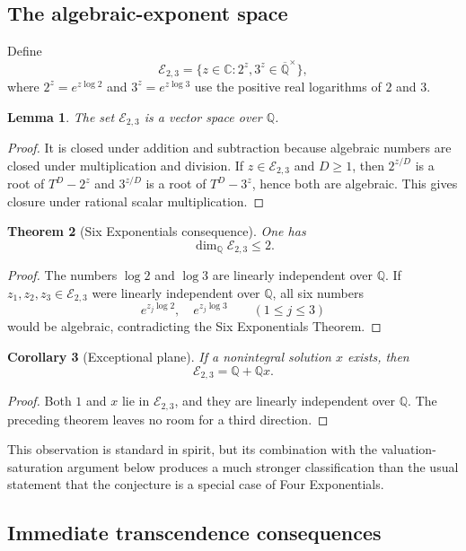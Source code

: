 \documentclass[11pt,oneside]{article}
\newtheorem{theorem}{Theorem}[section]
\newtheorem{lemma}[theorem]{Lemma}
\newtheorem{corollary}[theorem]{Corollary}
\theoremstyle{definition}
\newcommand{\Q}{\mathbb Q}
\newcommand{\C}{\mathbb C}
\newcommand{\Qbar}{\overline{\mathbb Q}}
\newcommand{\Espace}{\mathscr E_{2,3}}
\begin{document}
\subsection{The algebraic-exponent space}

Define
\[
  \Espace=\{z\in\C:2^z,3^z\in\Qbar^\times\},
\]
where $2^z=e^{z\log2}$ and $3^z=e^{z\log3}$ use the positive real logarithms of $2$ and $3$.

\begin{lemma}
The set $\Espace$ is a vector space over $\Q$.
\end{lemma}

\begin{proof}
It is closed under addition and subtraction because algebraic numbers are closed under multiplication and division.  If $z\in\Espace$ and $D\ge1$, then $2^{z/D}$ is a root of $T^D-2^z$ and $3^{z/D}$ is a root of $T^D-3^z$, hence both are algebraic.  This gives closure under rational scalar multiplication.
\end{proof}

\begin{theorem}[Six Exponentials consequence]
One has
\[
  \dim_{\Q}\Espace\le2.
\]
\end{theorem}

\begin{proof}
The numbers $\log2$ and $\log3$ are linearly independent over $\Q$.  If $z_1,z_2,z_3\in\Espace$ were linearly independent over $\Q$, all six numbers
\[
 e^{z_j\log2},\quad e^{z_j\log3}\qquad(1\le j\le3)
\]
would be algebraic, contradicting the Six Exponentials Theorem.
\end{proof}

\begin{corollary}[Exceptional plane]
If a nonintegral solution $x$ exists, then
\[
  \Espace=\Q+\Q x.
\]
\end{corollary}

\begin{proof}
Both $1$ and $x$ lie in $\Espace$, and they are linearly independent over $\Q$.  The preceding theorem leaves no room for a third direction.
\end{proof}

This observation is standard in spirit, but its combination with the valuation-saturation argument below produces a much stronger classification than the usual statement that the conjecture is a special case of Four Exponentials.

\subsection{Immediate transcendence consequences}
\end{document}
